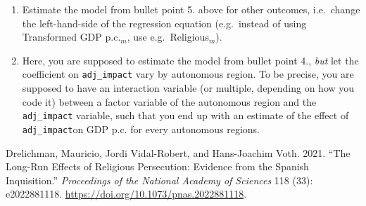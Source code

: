 \documentclass[
]{report}
\newlength{\cslhangindent}
\newlength{\cslentryspacingunit} %
\newenvironment{CSLReferences}[2] %
 {%
  \setlength{\parindent}{0pt}
  \ifodd #1
  \let\oldpar\par
  \def\par{\hangindent=\cslhangindent\oldpar}
  \fi
  \setlength{\parskip}{#2\cslentryspacingunit}
 }%
 {}
\begin{document}
\begin{enumerate}
\def\labelenumi{\arabic{enumi}.}
\item
  Estimate the model from bullet point 5. above for other outcomes,
  i.e.~change the left-hand-side of the regression equation
  (e.g.~instead of using Transformed GDP p.c.\(_m\), use
  e.g.~Religious\(_m\)).
\item
  Here, you are supposed to estimate the model from bullet point 4.,
  \emph{but} let the coefficient on \texttt{adj\_impact} vary by
  autonomous region. To be precise, you are supposed to have an
  interaction variable (or multiple, depending on how you code it)
  between a factor variable of the autonomous region and the
  \texttt{adj\_impact} variable, such that you end up with an estimate
  of the effect of \texttt{adj\_impact}on GDP p.c. for every autonomous
  regions.
\end{enumerate}

\pagebreak

\hypertarget{refs}{}
\begin{CSLReferences}{1}{0}
\leavevmode{}%
Drelichman, Mauricio, Jordi Vidal-Robert, and Hans-Joachim Voth. 2021.
{``The Long-Run Effects of Religious Persecution: Evidence from the
Spanish Inquisition.''} \emph{Proceedings of the National Academy of
Sciences} 118 (33): e2022881118.
\url{https://doi.org/10.1073/pnas.2022881118}.

\end{CSLReferences}
\end{document}
